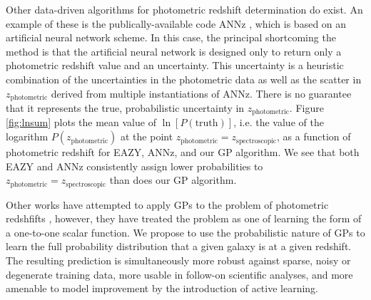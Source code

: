 \documentclass[useAMS,usenatbib,tightenlines,11pt,preprint]{aastex}
\begin{document}
Other data-driven algorithms for photometric redshift determination do exist. 
An example of these is the publically-available code ANNz \cite{annz},
which is based on an artificial neural network scheme.
In this case, the principal
shortcoming the method is that the artificial neural network
is designed only to return only a
photometric redshift value and an uncertainty.
This uncertainty is a heuristic combination of the uncertainties in the
photometric data as well as the scatter in $z_\text{photometric}$ derived
from multiple instantiations of ANNz.  There is no guarantee that it represents
the true, probabilistic uncertainty in $z_\text{photometric}$.
Figure \ref{fig:lnsum} plots the mean value of $\ln[P(\text{truth})]$,
i.e. the value of the logarithm $P(z_\text{photometric})$ at the point
$z_\text{photometric}=z_\text{spectroscopic}$, 
as a function
of photometric redshift for EAZY, ANNz, and our GP algorithm.
We see that both EAZY and ANNz consistently assign lower probabilities to
$z_\text{photometric}=z_\text{spectroscopic}$ than does our GP algorithm.

Other works have attempted to apply GPs to the problem of
photometric redshfifts \cite{kaufman,bonfield}, however, they have treated
the problem as one of learning the form of a one-to-one scalar function.
We propose to use the probabilistic nature of GPs to learn the full
probability distribution that a given galaxy is at a given redshift.  The
resulting prediction is simultaneously more robust against sparse, noisy or
degenerate training data, more usable in follow-on scientific analyses, and
more amenable to model improvement by the introduction of active learning.
\end{document}
